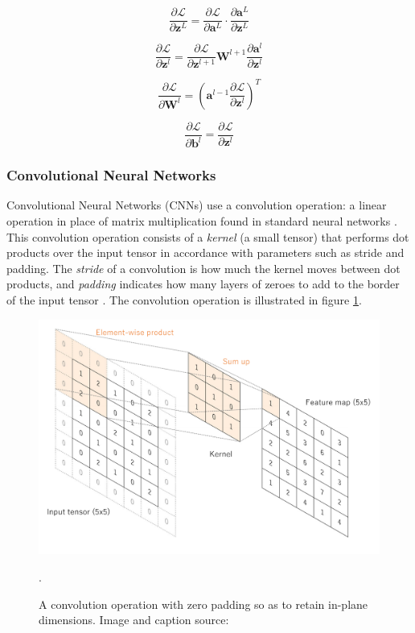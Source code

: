 \[\frac{\partial \mathcal{L}}{\partial \boldsymbol{z}^L} =\frac{\partial \mathcal{L}}{\partial \boldsymbol{a}^L} \cdot \frac{\partial \boldsymbol{a}^L}{\partial \boldsymbol{z}^L}\]

\[\frac{\partial \mathcal{L}}{\partial \boldsymbol{z}^l} = \frac{\partial \mathcal{L}}{\partial \boldsymbol{z}^{l+1}} \boldsymbol{W}^{l+1} \frac{\partial \boldsymbol{a}^l}{\partial \boldsymbol{z}^{l}}\]

\[\frac{\partial \mathcal{L}}{\partial \boldsymbol{W}^l} = (\boldsymbol{a}^{l-1} \frac{\partial \mathcal{L}}{\partial \boldsymbol{z}^l} )^T\]

\[\frac{\partial \mathcal{L}}{\partial \boldsymbol{b}^l} =\frac{\partial \mathcal{L}}{\partial \boldsymbol{z}^l}\]



\subsubsection{Convolutional Neural Networks}
Convolutional Neural Networks (CNNs) use a convolution operation: a linear operation in place of matrix multiplication found in standard neural networks \cite{cnn}. This convolution operation consists of a \textit{kernel} (a small tensor) that performs dot products over the input tensor in accordance with parameters such as stride and padding. The \textit{stride} of a convolution is how much the kernel moves between dot products, and \textit{padding} indicates how many layers of zeroes to add to the border of the input tensor \cite{cnn}. The convolution operation is illustrated in figure \ref{fig:cnn}.

\begin{figure}
    \centering
    \includegraphics[scale = 0.25]{images/cnn.png}
    \caption{A convolution operation with zero padding so as to retain in-plane dimensions. Image and caption source: \cite{cnnfig}}.
    \label{fig:cnn}
\end{figure}

